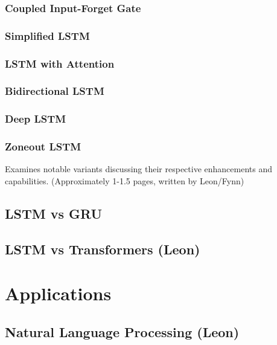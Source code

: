 \documentclass[twoside,a4paper,10pt,DIV=12,BCOR=12mm]{scrartcl}
\begin{document}
 \subsubsection{Coupled Input-Forget Gate}

\subsubsection{Simplified LSTM}

\subsubsection{LSTM with Attention}

\subsubsection{Bidirectional LSTM}

\subsubsection{Deep LSTM}

\subsubsection{Zoneout LSTM}

Examines notable variants discussing their respective enhancements and capabilities.
(Approximately 1-1.5 pages, written by Leon/Fynn)

\subsection{LSTM vs GRU}

\subsection{LSTM vs Transformers (Leon)}

\section{Applications}

\subsection{Natural Language Processing (Leon)}
\end{document}
